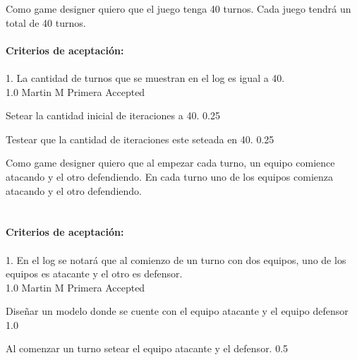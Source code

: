 	{Como game designer quiero que el juego tenga 40 turnos.} %
	{Cada juego tendr\'a un total de 40 turnos.
  \\
  \\
\textbf{Criterios de aceptación:}\\
  \\
1. La cantidad de turnos que se muestran en el log es igual a 40.  \\
} %
	{} %
	{1.0} %
	{Martin M} %
	{Primera} %
	{Accepted} %

		{Setear la cantidad inicial de iteraciones a 40.} %
		{} %
		{0.25} %
		{} %
		{} %
		{} %

		{Testear que la cantidad de iteraciones este seteada en 40.} %
		{} %
		{0.25} %
		{} %
		{} %
		{} %
\vspace{20pt}


	{Como game designer quiero que al empezar cada turno, un equipo comience atacando y el otro defendiendo.} %
	{En cada turno uno de los equipos comienza atacando y el otro defendiendo.
 \\
  \\
  \\
\textbf{Criterios de aceptación:}\\
  \\
1. En el log se notar\'a que al comienzo de un turno con dos equipos, uno de los equipos es atacante y el otro es defensor.  \\
} %
	{} %
	{1.0} %
	{Martin M} %
	{Primera} %
	{Accepted} %

		{Diseñar un modelo donde se cuente con el equipo atacante y el equipo defensor} %
		{} %
		{1.0} %
		{} %
		{} %
		{} %

		{Al comenzar un turno setear el equipo atacante y el defensor.} %
		{} %
		{0.5} %
		{} %
		{} %
		{} %

